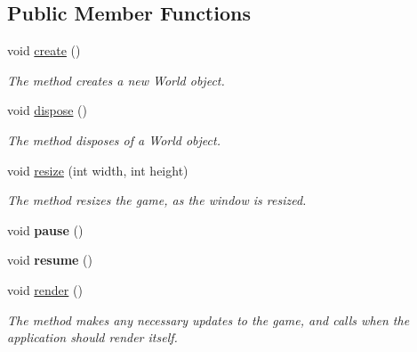 \subsection*{Public Member Functions}
\begin{DoxyCompactItemize}
\item 
\mbox{\label{classnl_1_1arjanfrans_1_1mario_1_1MarioGame_aef8d04f801a81a7948105c486e5e6b1b}} 
void \hyperlink{classnl_1_1arjanfrans_1_1mario_1_1MarioGame_aef8d04f801a81a7948105c486e5e6b1b}{create} ()
\begin{DoxyCompactList}\small\item\em The method creates a new World object. \end{DoxyCompactList}\item 
\mbox{\label{classnl_1_1arjanfrans_1_1mario_1_1MarioGame_a6aa0140a701c4f9cb620204cf319e826}} 
void \hyperlink{classnl_1_1arjanfrans_1_1mario_1_1MarioGame_a6aa0140a701c4f9cb620204cf319e826}{dispose} ()
\begin{DoxyCompactList}\small\item\em The method disposes of a World object. \end{DoxyCompactList}\item 
\mbox{\label{classnl_1_1arjanfrans_1_1mario_1_1MarioGame_aa398b3da01339cdb1981b32c4bbed52b}} 
void \hyperlink{classnl_1_1arjanfrans_1_1mario_1_1MarioGame_aa398b3da01339cdb1981b32c4bbed52b}{resize} (int width, int height)
\begin{DoxyCompactList}\small\item\em The method resizes the game, as the window is resized. \end{DoxyCompactList}\item 
\mbox{\label{classnl_1_1arjanfrans_1_1mario_1_1MarioGame_af3a9dd63e2fba4bedc74e25cd4fec05c}} 
void {\bfseries pause} ()
\item 
\mbox{\label{classnl_1_1arjanfrans_1_1mario_1_1MarioGame_a31b58f0d118a0f087c8a616157354480}} 
void {\bfseries resume} ()
\item 
\mbox{\label{classnl_1_1arjanfrans_1_1mario_1_1MarioGame_a169a3a638096d8929297d095051cbc6c}} 
void \hyperlink{classnl_1_1arjanfrans_1_1mario_1_1MarioGame_a169a3a638096d8929297d095051cbc6c}{render} ()
\begin{DoxyCompactList}\small\item\em The method makes any necessary updates to the game, and calls when the application should render itself. \end{DoxyCompactList}\end{DoxyCompactItemize}
